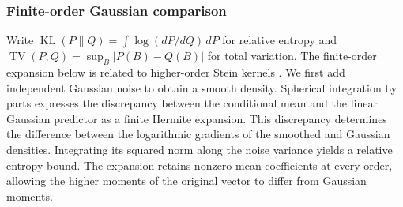 \documentclass[11pt,reqno]{amsart}
\numberwithin{equation}{section}
\theoremstyle{definition}
\theoremstyle{remark}
\theoremstyle{definition}
\DeclareMathOperator{\TV}{TV}
\DeclareMathOperator{\KL}{KL}
\begin{document}
\subsubsection{Finite-order Gaussian comparison}
Write $\KL(P\|Q)=\int\log(dP/dQ)\,dP$ for relative entropy and
$\TV(P,Q)=\sup_B|P(B)-Q(B)|$ for total variation.
The finite-order expansion below is related to higher-order Stein kernels \cite{Fathi}.
We first add independent Gaussian noise to obtain a smooth density.
Spherical integration by parts expresses the discrepancy between the conditional mean and the linear Gaussian predictor as a finite Hermite expansion.
This discrepancy determines the difference between the logarithmic gradients of the smoothed and Gaussian densities.
Integrating its squared norm along the noise variance yields a relative entropy bound.
The expansion retains nonzero mean coefficients at every order, allowing the higher moments of the original vector to differ from Gaussian moments.
\end{document}
